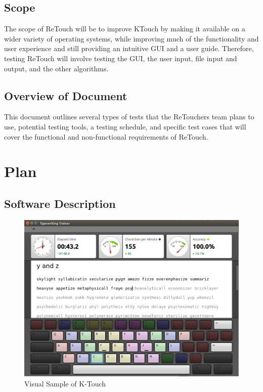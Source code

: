 \documentclass[12pt, titlepage]{article}
\begin{document}
\subsection{Scope}

	The scope of ReTouch will be to improve KTouch by making it available on {\color{cyan} a wider variety of operating systems, while improving much of the functionality and user experience and still providing an intuitive GUI and a user guide.} Therefore, testing ReTouch will involve testing the GUI, the user input, file input and output, and the other algorithms. 

\subsection{Overview of Document}

	This document outlines several types of tests that the ReTouchers team plans to use, potential testing tools, a testing schedule, and specific test cases that will cover the functional and non-functional requirements of ReTouch. 

\section{Plan}
	
\subsection{Software Description}

\begin{figure}[h!]
	\includegraphics[scale=0.5]{KTouchLesson.png}
	\centering
	\caption{Visual Sample of K-Touch}
	\label{figure:1}
\end{figure}
\end{document}
